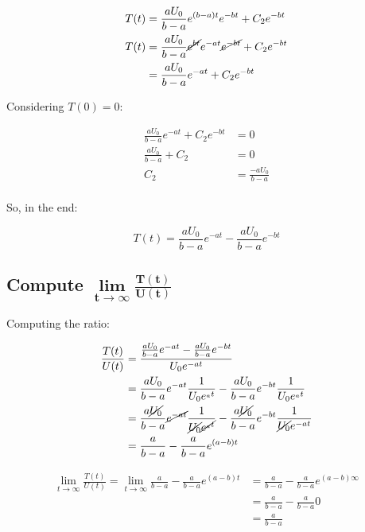   \begin{align*}
    T(t) & = \frac{aU_0}{b-a}e^{(b-a)t}e^{-bt} + C_2e^{-bt}\\
    T(t) & = \frac{aU_0}{b-a}\cancel{e^{bt}}e^{-at}\cancel{e^{-bt}} + C_2e^{-bt}\\
         & = \frac{aU_0}{b-a}e^{-at} + C_2e^{-bt}
  \end{align*}

  Considering $T(0) = 0$:

  \begin{align*}
    \frac{aU_0}{b-a}e^{-at} + C_2e^{-bt} & = 0\\
    \frac{aU_0}{b-a} + C_2 & = 0\\
    C_2 &= \frac{-aU_0}{b-a}\\
  \end{align*}

  So, in the end:

  $$T(t) = \frac{aU_0}{b-a}e^{-at} - \frac{aU_0}{b-a}e^{-bt}$$

  \subsection{Compute $\mathbf{\lim\limits_{t \to \infty} \frac{T(t)}{U(t)}}$}

  Computing the ratio:

  \begin{align*}
     \frac{T(t)}{U(t)} &= \frac{\frac{aU_0}{b-a}e^{-at} - \frac{aU_0}{b-a}e^{-bt}}{U_0e^{-at}}\\
                       &= \frac{aU_0}{b-a}e^{-at}\frac{1}{U_0e^{_at}} - \frac{aU_0}{b-a}e^{-bt}\frac{1}{U_0e^{_at}}\\
                       &= \frac{a\cancel{U_0}}{b-a}\cancel{e^{-at}}\frac{1}{\cancel{U_0}\cancel{e^{_at}}} - \frac{a\cancel{U_0}}{b-a}e^{-bt}\frac{1}{\cancel{U_0}e^{-at}}\\
                       &= \frac{a}{b-a} - \frac{a}{b-a}e^{(a-b)t}
   \end{align*}


  \begin{align*}
    \lim\limits_{t \to \infty} \frac{T(t)}{U(t)} = \lim\limits_{t\to\infty} \frac{a}{b-a} - \frac{a}{b-a}e^{(a-b)t} &= \frac{a}{b-a} - \frac{a}{b-a}e^{(a-b)\infty}\\
                                          &= \frac{a}{b-a} - \frac{a}{b-a}0\\
                                          &= \frac{a}{b-a}\\
  \end{align*}

